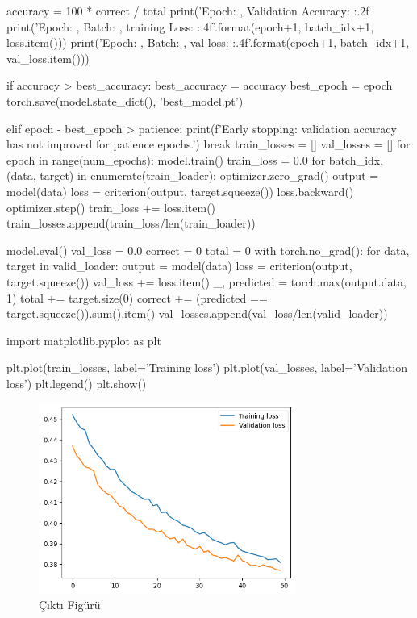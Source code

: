 \documentclass[11pt]{article}
\begin{document}
\begin{python}
    accuracy = 100 * correct / total
    print('Epoch: {}, Validation Accuracy: {:.2f}%
    print('Epoch: {}, Batch: {}, training Loss: {:.4f}'.format(epoch+1, batch_idx+1, loss.item()))
    print('Epoch: {}, Batch: {}, val loss: {:.4f}'.format(epoch+1, batch_idx+1, val_loss.item()))
    
    if accuracy > best_accuracy:
        best_accuracy = accuracy
        best_epoch = epoch
        torch.save(model.state_dict(), 'best_model.pt')
  
    elif epoch - best_epoch > patience:
        print(f'Early stopping: validation accuracy has not improved for {patience} epochs.')
        break
train_losses = []
val_losses = []
for epoch in range(num_epochs):
    model.train()
    train_loss = 0.0
    for batch_idx, (data, target) in enumerate(train_loader):
        optimizer.zero_grad()
        output = model(data)
        loss = criterion(output, target.squeeze())
        loss.backward()
        optimizer.step()
        train_loss += loss.item()
    train_losses.append(train_loss/len(train_loader))

    model.eval()
    val_loss = 0.0
    correct = 0
    total = 0
    with torch.no_grad():
        for data, target in valid_loader:
            output = model(data)
            loss = criterion(output, target.squeeze())
            val_loss += loss.item()
            _, predicted = torch.max(output.data, 1)
            total += target.size(0)
            correct += (predicted == target.squeeze()).sum().item()
        val_losses.append(val_loss/len(valid_loader))   

import matplotlib.pyplot as plt

plt.plot(train_losses, label='Training loss')
plt.plot(val_losses, label='Validation loss')
plt.legend()
plt.show()
\end{python}


\begin{figure}[ht!]
    \centering
    \includegraphics[width=0.75\textwidth]{ysa1.png}
    \caption{Çıktı Figürü}
    \label{fig:my_pic}
\end{figure}
\end{document}

